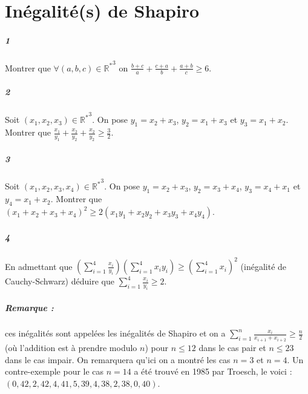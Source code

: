 \documentclass[10pt,a4paper]{article}
\begin{document}
\section{Inégalité(s) de Shapiro}
\subparagraph{1}Montrer que $\forall (a,b,c) \in {\mathbb{R}^*}^3$ on  $\frac{b+c}{a}+\frac{c+a}{b}+\frac{a+b}{c} \ge 6$.
\subparagraph{2}Soit $(x_1,x_2,x_3)\in {\mathbb{R}^*}^3$. On pose $y_1=x_2+x_3$, $y_2=x_1+x_3$ et $y_3=x_1+x_2$. Montrer que $\frac{x_1}{y_1}+\frac{x_2}{y_2}+\frac{x_2}{y_2} \ge \frac{3}{2}$.
\subparagraph{3} Soit $(x_1,x_2,x_3,x_4)\in {\mathbb{R}^*}^3$. On pose $y_1=x_2+x_3$, $y_2=x_3+x_4$, $y_3=x_4+x_1$ et $y_4=x_1+x_2$. Montrer que $(x_1+x_2+x_3+x_4)^2 \ge 2(x_1 y_1+x_2 y_2 +x_3 y_3+x_4 y_4)$.
\subparagraph{4}En admettant que $\left(\sum_{i=1}^4 \frac{x_i}{y_i} \right) \left(\sum_{i=1}^4 x_i y_i \right) \ge \left(\sum_{i=1}^4 x_i \right)^2$ (inégalité de Cauchy-Schwarz) déduire que $\sum_{i=1}^4 \frac{x_i}{y_i} \ge 2$.
\subparagraph{Remarque :} ces inégalités sont appelées les inégalités de Shapiro et on a $\sum_{i=1}^n \frac{x_i}{x_{i+1}+x_{i+2}} \ge \frac{n}{2}$ (où l'addition est à prendre modulo $n$) pour $n \le 12 $ dans le cas pair et $n \le 23$ dans le cas impair. On remarquera qu'ici on a montré les cas $n=3$ et $n=4$. Un contre-exemple pour le cas $n=14$ a été trouvé en 1985 par Troesch, le voici : $(0, 42, 2, 42, 4, 41, 5, 39, 4, 38, 2, 38, 0, 40)$.
\end{document}
